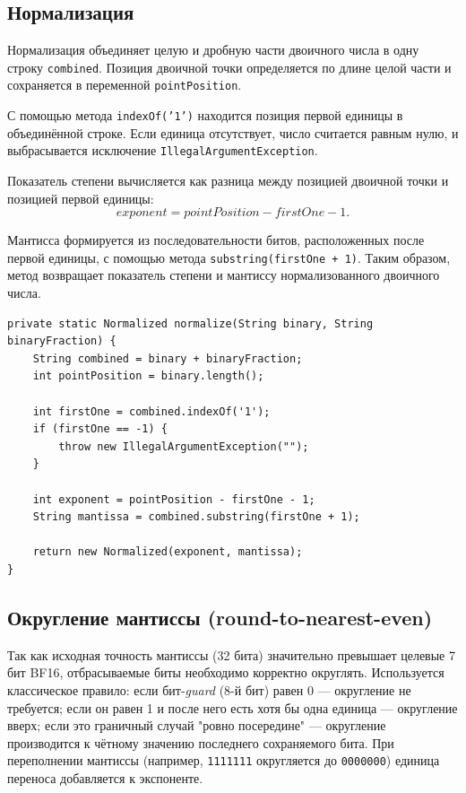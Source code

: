 \documentclass[12pt,a4paper]{article}
\begin{document}
\subsection{Нормализация}

Нормализация объединяет целую и дробную части двоичного
числа в одну строку \texttt{combined}. Позиция двоичной точки определяется
по длине целой части и сохраняется в переменной \texttt{pointPosition}.

С помощью метода \texttt{indexOf('1')} находится позиция первой единицы в
объединённой строке. Если единица отсутствует, число считается равным нулю,
и выбрасывается исключение \texttt{IllegalArgumentException}.

Показатель степени вычисляется как разница между позицией двоичной точки и
позицией первой единицы:
\[
exponent = pointPosition - firstOne - 1.
\]

Мантисса формируется из последовательности битов, расположенных после первой
единицы, с помощью метода \texttt{substring(firstOne + 1)}. Таким образом,
метод возвращает показатель степени и мантиссу нормализованного двоичного
числа.

\begin{lstlisting}[caption={Нормализация через деление/умножение на 2}]
private static Normalized normalize(String binary, String binaryFraction) {
    String combined = binary + binaryFraction;
    int pointPosition = binary.length();

    int firstOne = combined.indexOf('1');
    if (firstOne == -1) {
        throw new IllegalArgumentException("");
    }

    int exponent = pointPosition - firstOne - 1;
    String mantissa = combined.substring(firstOne + 1);

    return new Normalized(exponent, mantissa);
}
\end{lstlisting}

\subsection{Округление мантиссы (round-to-nearest-even)}

Так как исходная точность мантиссы (32 бита) значительно превышает
целевые 7 бит BF16, отбрасываемые биты необходимо корректно округлять.
Используется классическое правило: если бит-\textit{guard} (8-й бит) равен
0 — округление не требуется; если он равен 1 и после него есть хотя бы
одна единица — округление вверх; если это граничный случай "ровно
посередине" — округление производится к чётному значению последнего
сохраняемого бита. При переполнении мантиссы (например, \texttt{1111111}
округляется до \texttt{0000000}) единица переноса добавляется к
экспоненте.
\end{document}
